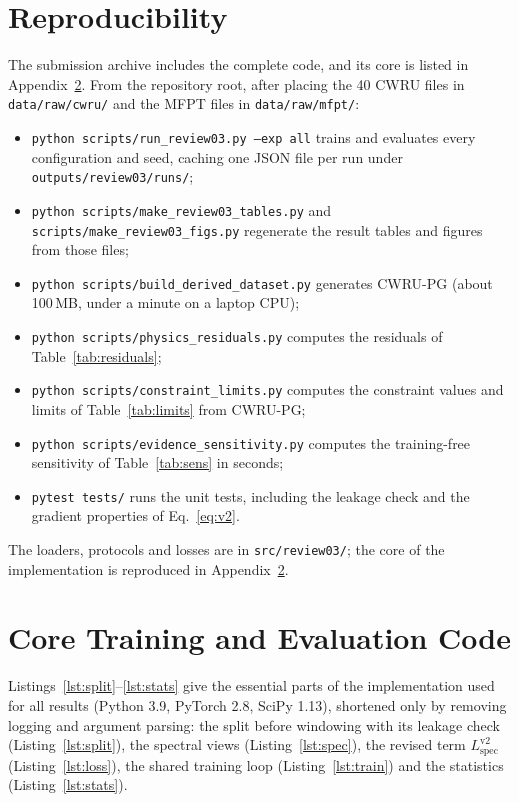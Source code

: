 \documentclass[conference]{IEEEtran}
\newcommand{\Lspec}{L_{\mathrm{spec}}}
\begin{document}
\section{Reproducibility}
\label{sec:repro}
The submission archive includes the complete code, and its core is listed in
Appendix~\ref{app:code}. From the repository root,
after placing the 40 CWRU files in \texttt{data/raw/cwru/} and the MFPT files in
\texttt{data/raw/mfpt/}:
\begin{itemize}
\item \texttt{python scripts/run\_review03.py --exp all} trains and evaluates
every configuration and seed, caching one JSON file per run under
\texttt{outputs/review03/runs/};
\item \texttt{python scripts/make\_review03\_tables.py} and
\texttt{scripts/make\_review03\_figs.py} regenerate the result tables and figures from those files;
\item \texttt{python scripts/build\_derived\_dataset.py} generates CWRU-PG
(about 100\,MB, under a minute on a laptop CPU);
\item \texttt{python scripts/physics\_residuals.py} computes the residuals of
Table~\ref{tab:residuals};
\item \texttt{python scripts/constraint\_limits.py} computes the constraint
values and limits of Table~\ref{tab:limits} from CWRU-PG;
\item \texttt{python scripts/evidence\_sensitivity.py} computes the
training-free sensitivity of Table~\ref{tab:sens} in seconds;
\item \texttt{pytest tests/} runs the unit tests, including the leakage check
and the gradient properties of Eq.~\eqref{eq:v2}.
\end{itemize}
The loaders, protocols and losses are in \texttt{src/review03/}; the core of
the implementation is reproduced in Appendix~\ref{app:code}.

\appendices
\section{Core Training and Evaluation Code}
\label{app:code}
Listings~\ref{lst:split}--\ref{lst:stats} give the essential parts of the
implementation used for all results (Python 3.9, PyTorch 2.8, SciPy 1.13),
shortened only by removing logging and argument parsing: the split before
windowing with its leakage check (Listing~\ref{lst:split}), the spectral views
(Listing~\ref{lst:spec}), the revised term $\Lspec^{\mathrm{v2}}$
(Listing~\ref{lst:loss}), the shared training loop (Listing~\ref{lst:train}) and
the statistics (Listing~\ref{lst:stats}).
\end{document}
